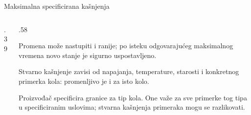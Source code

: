 \begin{frame}[label=02-s005]{Maksimalna specificirana kašnjenja}
\begin{columns}[T,onlytextwidth]
\begin{column}{.39\textwidth}\centering

\par\vspace{2mm}
\end{column}
\begin{column}{.58\textwidth}
\par\vspace{2mm}
Promena može nastupiti i ranije; po isteku odgovarajućeg maksimalnog vremena novo stanje je sigurno uspostavljeno.
\par\vspace{2mm}
Stvarno kašnjenje zavisi od napajanja, temperature, starosti i konkretnog primerka kola: \alert{promenljivo je i za isto kolo}.
\par\vspace{2mm}
Proizvođač specificira granice za \alert{tip kola}. One važe za \alert{sve primerke} tog tipa u specificiranim uslovima; stvarna kašnjenja primeraka mogu se razlikovati.
\end{column}
\end{columns}
\end{frame}
